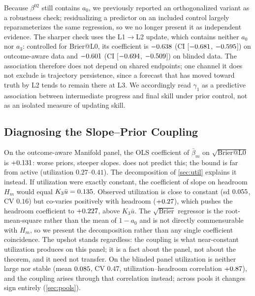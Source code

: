 \documentclass[conference]{IEEEtran}
\theoremstyle{plain}
\theoremstyle{remark}
\begin{document}
Because $\beta^{02}$ still contains $a_0$, we previously reported an orthogonalized variant as a robustness check; residualizing a predictor on an included control largely reparameterizes the same regression, so we no longer present it as independent evidence. The sharper check uses the L1$\to$L2 update, which contains neither $a_0$ nor $a_3$: controlled for Brier@L0, its coefficient is $-0.638$ (CI [$-0.681$, $-0.595$]) on outcome-aware data and $-0.601$ (CI [$-0.694$, $-0.509$]) on blinded data. The association therefore does not depend on shared endpoints; one channel it does not exclude is trajectory persistence, since a forecast that has moved toward truth by L2 tends to remain there at L3. We accordingly read $\gamma_1$ as a predictive association between intermediate progress and final skill under prior control, not as an isolated measure of updating skill.

\subsection{Diagnosing the Slope--Prior Coupling}
\label{sec:mech}

On the outcome-aware Manifold panel, the OLS coefficient of $\bar\beta_m$ on $\sqrt{\mathrm{Brier@L0}}$ is $+0.131$: worse priors, steeper slopes.  does not predict this; the bound is far from active (utilization $0.27$--$0.41$). The decomposition of \cref{sec:util} explains it instead. If utilization were exactly constant, the coefficient of slope on headroom $H_m$ would equal $K_3\bar u = 0.135$. Observed utilization is close to constant (sd $0.055$, CV $0.16$) but co-varies positively with headroom ($+0.27$), which pushes the headroom coefficient to $+0.227$, above $K_3\bar u$. The $\sqrt{\mathrm{Brier}}$ regressor is the root-mean-square rather than the mean of $1 - a_0$ and is not directly commensurable with $H_m$, so we present the decomposition rather than any single coefficient coincidence. The upshot stands regardless: the coupling is what near-constant utilization produces on this panel; it is a fact about the panel, not about the theorem, and it need not transfer. On the blinded panel utilization is neither large nor stable (mean $0.085$, CV $0.47$, utilization--headroom correlation $+0.87$), and the coupling arises through that correlation instead; across pools it changes sign entirely (\cref{sec:pools}).
\end{document}
